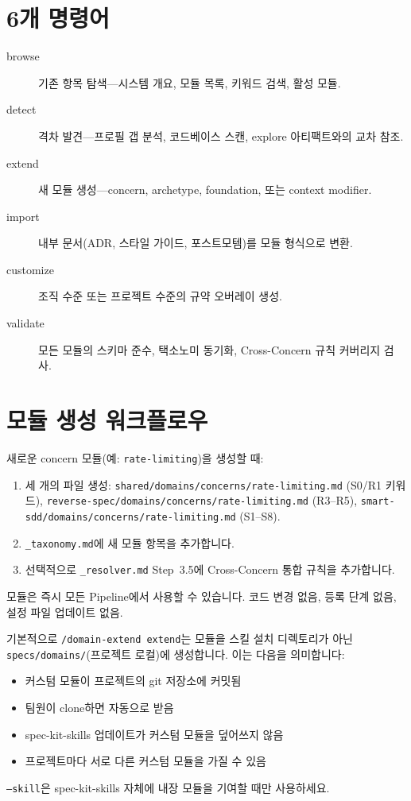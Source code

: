 \documentclass[11pt,a4paper,openright,twoside]{report}
\newcommand{\cmd}[1]{\texttt{/#1}}
\newcommand{\file}[1]{\texttt{#1}}
\begin{document}
\section{6개 명령어}

\begin{description}
  \item[browse] 기존 항목 탐색---시스템 개요, 모듈 목록, 키워드 검색, 활성 모듈.
  \item[detect] 격차 발견---프로필 갭 분석, 코드베이스 스캔, explore 아티팩트와의 교차 참조.
  \item[extend] 새 모듈 생성---concern, archetype, foundation, 또는 context modifier.
  \item[import] 내부 문서(ADR, 스타일 가이드, 포스트모템)를 모듈 형식으로 변환.
  \item[customize] 조직 수준 또는 프로젝트 수준의 규약 오버레이 생성.
  \item[validate] 모든 모듈의 스키마 준수, 택소노미 동기화, Cross-Concern 규칙 커버리지 검사.
\end{description}

\section{모듈 생성 워크플로우}

새로운 concern 모듈(예: \texttt{rate-limiting})을 생성할 때:

\begin{enumerate}
  \item 세 개의 파일 생성: \file{shared/domains/concerns/rate-limiting.md} (S0/R1 키워드), \file{reverse-spec/domains/concerns/rate-limiting.md} (R3--R5), \file{smart-sdd/domains/concerns/rate-limiting.md} (S1--S8).
  \item \file{\_taxonomy.md}에 새 모듈 항목을 추가합니다.
  \item 선택적으로 \file{\_resolver.md} Step~3.5에 Cross-Concern 통합 규칙을 추가합니다.
\end{enumerate}

모듈은 즉시 모든 Pipeline에서 사용할 수 있습니다. 코드 변경 없음, 등록 단계 없음, 설정 파일 업데이트 없음.

\begin{warnbox}
기본적으로 \cmd{domain-extend extend}는 모듈을 스킬 설치 디렉토리가 아닌 \file{specs/domains/}(프로젝트 로컬)에 생성합니다. 이는 다음을 의미합니다:
\begin{itemize}[nosep]
\item 커스텀 모듈이 프로젝트의 git 저장소에 커밋됨
\item 팀원이 clone하면 자동으로 받음
\item spec-kit-skills 업데이트가 커스텀 모듈을 덮어쓰지 않음
\item 프로젝트마다 서로 다른 커스텀 모듈을 가질 수 있음
\end{itemize}
\texttt{--skill}은 spec-kit-skills 자체에 내장 모듈을 기여할 때만 사용하세요.
\end{warnbox}
\end{document}
